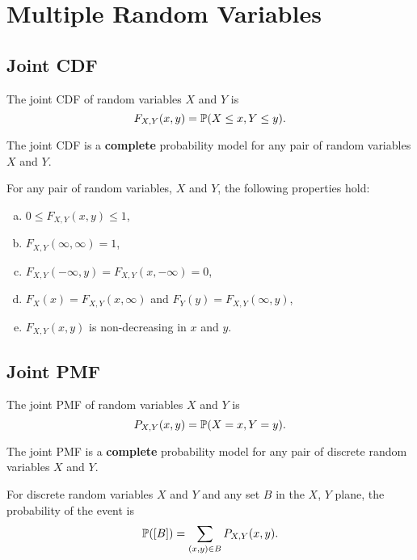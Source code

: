 \chapter{Multiple Random Variables}

\section{Joint CDF}
\begin{definition}
    The joint CDF of random variables $X$ and $Y$ is 
    \[F_{X,Y}(x,y) = \P{X\leq x, Y\leq y}.\]
\end{definition}

The joint CDF is a \textbf{complete} probability model for any pair of random variables $X$ and $Y$.

\begin{theorem}
    For any pair of random variables, $X$ and $Y$, the following properties hold:
    \begin{enumerate}[(a)]
        \item $0 \leq F_{X,Y}(x,y) \leq 1$,
        \item $F_{X,Y}(\infty,\infty)=1$,
        \item $F_{X,Y}(-\infty,y)=F_{X,Y}(x,-\infty)=0$,
        \item $F_X(x)=F_{X,Y}(x,\infty)$ and $F_Y(y)=F_{X,Y}(\infty,y)$,
        \item $F_{X,Y}(x,y)$ is non-decreasing in $x$ and $y$.
    \end{enumerate}
\end{theorem}

\section{Joint PMF}
\begin{definition}
    The joint PMF of random variables $X$ and $Y$ is 
    \[P_{X,Y}(x,y) = \P{X=x, Y=y}.\]    
\end{definition}

The joint PMF is a \textbf{complete} probability model for any pair of discrete random variables $X$ and $Y$.

\begin{theorem}
    For discrete random variables $X$ and $Y$ and any set $B$ in the $X$, $Y$ plane, the probability of the event 
    is 
    \[\P{[B]}=\sum_{(x,y)\in B}P_{X,Y}(x,y).\]
\end{theorem}

